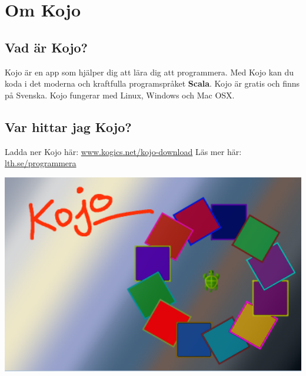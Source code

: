 \chapter{Om Kojo}
\begin{multicols}{2}
\section*{\color{black}Vad är Kojo?}
Kojo är en app som hjälper dig att lära dig att programmera. Med Kojo kan du koda i det moderna och kraftfulla programspråket {\bf\color{blue}Scala}. Kojo är gratis och finns på Svenska. Kojo fungerar med Linux, Windows och Mac OSX.
\section*{\color{black}Var hittar jag Kojo?}
Ladda ner Kojo här: 
\href{http://www.kogics.net/kojo-download}{www.kogics.net/kojo-download}
Läs mer här: 
\href{http://lth.se/programmera}{lth.se/programmera}

\columnbreak

\begin{center}
\includegraphics[width=14.0cm]{../img/kojo.png}
\end{center}

\end{multicols}

